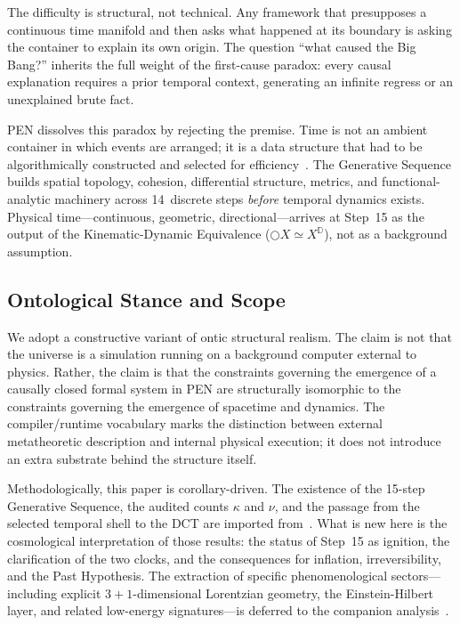 \documentclass[11pt,a4paper]{article}
\theoremstyle{plain}
\theoremstyle{definition}
\theoremstyle{remark}
\newcommand{\D}{\mathbb{D}}
\newcommand{\nextmod}{\bigcirc}
\begin{document}
The difficulty is structural, not technical.
Any framework that presupposes a continuous time manifold and then asks what happened at its boundary is asking the container to explain its own origin.
The question ``what caused the Big Bang?'' inherits the full weight of the first-cause paradox: every causal explanation requires a prior temporal context, generating an infinite regress or an unexplained brute fact.

PEN dissolves this paradox by rejecting the premise.
Time is not an ambient container in which events are arranged; it is a data structure that had to be algorithmically constructed and selected for efficiency~\cite{pen}.
The Generative Sequence builds spatial topology, cohesion, differential structure, metrics, and functional-analytic machinery across 14~discrete steps \emph{before} temporal dynamics exists.
Physical time---continuous, geometric, directional---arrives at Step~15 as the output of the Kinematic-Dynamic Equivalence ($\nextmod X \simeq X^{\D}$), not as a background assumption.

\subsection{Ontological Stance and Scope}
\label{sec:stance}

We adopt a constructive variant of ontic structural realism.
The claim is not that the universe is a simulation running on a background computer external to physics.
Rather, the claim is that the constraints governing the emergence of a causally closed formal system in PEN are structurally isomorphic to the constraints governing the emergence of spacetime and dynamics.
The compiler/runtime vocabulary marks the distinction between external metatheoretic description and internal physical execution; it does not introduce an extra substrate behind the structure itself.

Methodologically, this paper is corollary-driven.
The existence of the 15-step Generative Sequence, the audited counts $\kappa$ and $\nu$, and the passage from the selected temporal shell to the DCT are imported from~\cite{pen}.
What is new here is the cosmological interpretation of those results: the status of Step~15 as ignition, the clarification of the two clocks, and the consequences for inflation, irreversibility, and the Past Hypothesis.
The extraction of specific phenomenological sectors---including explicit $3+1$-dimensional Lorentzian geometry, the Einstein-Hilbert layer, and related low-energy signatures---is deferred to the companion analysis~\cite{gr-companion}.
\end{document}
